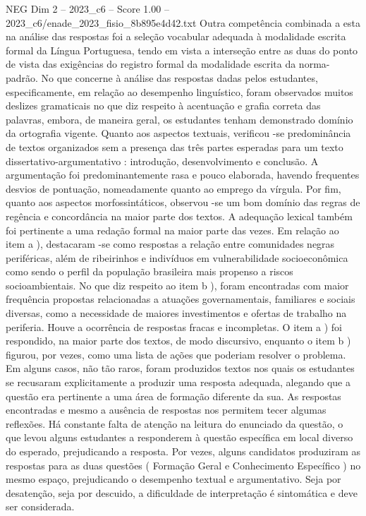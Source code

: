 \begin{textsample}{NEG Dim 2 – 2023\_c6 – Score 1.00 – 2023\_c6/enade\_2023\_fisio\_8b895e4d42.txt}
Outra competência combinada a esta na análise das respostas foi a seleção vocabular adequada à modalidade escrita formal da Língua Portuguesa, tendo em vista a interseção entre as duas do ponto de vista das exigências do registro formal da modalidade escrita da norma-padrão.
No que concerne à análise das respostas dadas pelos estudantes, especificamente, em relação ao desempenho linguístico, foram observados muitos deslizes gramaticais no que diz respeito à acentuação e grafia correta das palavras, embora, de maneira geral, os estudantes tenham demonstrado domínio da ortografia vigente.
Quanto aos aspectos textuais, verificou -se predominância de textos organizados sem a presença das três partes esperadas para um texto dissertativo-argumentativo : introdução, desenvolvimento e conclusão.
A argumentação foi predominantemente rasa e pouco elaborada, havendo frequentes desvios de pontuação, nomeadamente quanto ao emprego da vírgula.
Por fim, quanto aos aspectos morfossintáticos, observou -se um bom domínio das regras de regência e concordância na maior parte dos textos.
A adequação lexical também foi pertinente a uma redação formal na maior parte das vezes.
Em relação ao item a ), destacaram -se como respostas a relação entre comunidades negras periféricas, além de ribeirinhos e indivíduos em vulnerabilidade socioeconômica como sendo o perfil da população brasileira mais propenso a riscos socioambientais.
No que diz respeito ao item b ), foram encontradas com maior frequência propostas relacionadas a atuações governamentais, familiares e sociais diversas, como a necessidade de maiores investimentos e ofertas de trabalho na periferia.
Houve a ocorrência de respostas fracas e incompletas.
O item a ) foi respondido, na maior parte dos textos, de modo discursivo, enquanto o item b ) figurou, por vezes, como uma lista de ações que poderiam resolver o problema.
Em alguns casos, não tão raros, foram produzidos textos nos quais os estudantes se recusaram explicitamente a produzir uma resposta adequada, alegando que a questão era pertinente a uma área de formação diferente da sua.
As respostas encontradas e mesmo a ausência de respostas nos permitem tecer algumas reflexões.
Há constante falta de atenção na leitura do enunciado da questão, o que levou alguns estudantes a responderem à questão específica em local diverso do esperado, prejudicando a resposta.
Por vezes, alguns candidatos produziram as respostas para as duas questões ( Formação Geral e Conhecimento Específico ) no mesmo espaço, prejudicando o desempenho textual e argumentativo.
Seja por desatenção, seja por descuido, a dificuldade de interpretação é sintomática e deve ser considerada.

\end{textsample}
